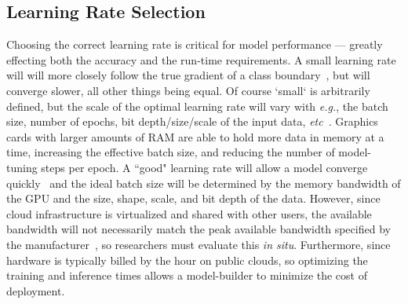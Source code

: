 \documentclass[conference]{IEEEtran}
\begin{document}
\subsection{Learning Rate Selection}
\label{learning_rate}

Choosing the correct learning rate is critical for model performance --- greatly effecting both the accuracy and the run-time requirements. A small learning rate will will more closely follow the true gradient of a class boundary~\cite{cao2019generalization}, but will converge slower, all other things being equal. Of course `small` is arbitrarily defined, but the scale of the optimal learning rate will vary with \textit{e.g.}, the batch size, number of epochs, bit depth/size/scale of the input data, \textit{etc}~\cite{granziol2022learning}. Graphics cards with larger amounts of RAM are able to hold more data in memory at a time, increasing the effective batch size, and reducing the number of model-tuning steps per epoch. A ``good" learning rate will allow a model converge quickly~\cite{smith2019super,granziol2022learning} and the ideal batch size will be determined by the memory bandwidth of the GPU and the size, shape, scale, and bit depth of the data. However, since cloud infrastructure is virtualized and shared with other users, the available bandwidth will not necessarily match the peak available bandwidth specified by the manufacturer~\cite{sajid2013cloud}, so researchers must evaluate this \textit{in situ}. Furthermore, since hardware is typically billed by the hour on public clouds, so optimizing the training and inference times allows a model-builder to minimize the cost of deployment. 
\end{document}
